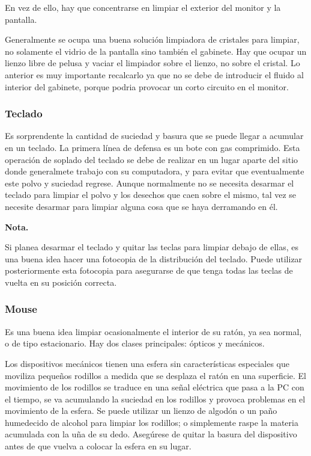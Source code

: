 \documentclass[landscape]{article}
\begin{document}
\begin{multicols}{3}
En vez de ello, hay que concentrarse en limpiar el exterior del monitor y la pantalla.
\columnbreak

Generalmente se ocupa una buena soluci\'on limpiadora de cristales para limpiar, no solamente el vidrio de la pantalla sino tambi\'en el gabinete. Hay que ocupar un lienzo libre de pelusa y vaciar el limpiador sobre el lienzo, no sobre el cristal. Lo anterior es muy importante recalcarlo ya que no se debe de introducir el fluido al interior del gabinete, porque podria provocar un corto circuito en el monitor.

\subsubsection*{Teclado}

Es sorprendente la cantidad de suciedad y basura que se puede llegar a acumular en un teclado. La primera l\'inea de defensa es un bote con gas comprimido. Esta operaci\'on de soplado del teclado se debe de realizar en un lugar aparte del sitio donde generalmete trabajo con su computadora, y para evitar que eventualmente este polvo y suciedad regrese. Aunque normalmente no se necesita desarmar el teclado para limpiar el polvo y los desechos que caen sobre el mismo, tal vez se necesite desarmar para limpiar alguna cosa que se haya derramando en \'el.

{\bf Nota.}

Si planea desarmar el teclado y quitar las teclas para limpiar debajo de ellas, es una buena idea hacer una fotocopia de la distribuci\'on del teclado. Puede utilizar posteriormente esta fotocopia para asegurarse de que tenga todas las teclas de vuelta en su posici\'on correcta.


\subsubsection*{Mouse}

Es una buena idea limpiar ocasionalmente el interior de su rat\'on, ya sea normal, o de tipo estacionario. Hay dos clases principales: \'opticos y mec\'anicos.

Los dispositivos mec\'anicos tienen una esfera sin caracter\'isticas especiales que moviliza peque\~nos rodillos a medida que se desplaza el rat\'on en una superficie. El movimiento de los rodillos se traduce en una se\~nal el\'ectrica que pasa a la PC con el tiempo, se va acumulando la suciedad en los rodillos y provoca problemas en el movimiento de la esfera. Se puede utilizar un lienzo de algod\'on o un pa\~no humedecido de alcohol para limpiar los rodillos; o simplemente raspe la materia acumulada con la u\~na de su dedo. Aseg\'urese de quitar la basura del dispositivo antes de que vuelva a colocar la esfera en su lugar.

\end{multicols}
\end{document}
